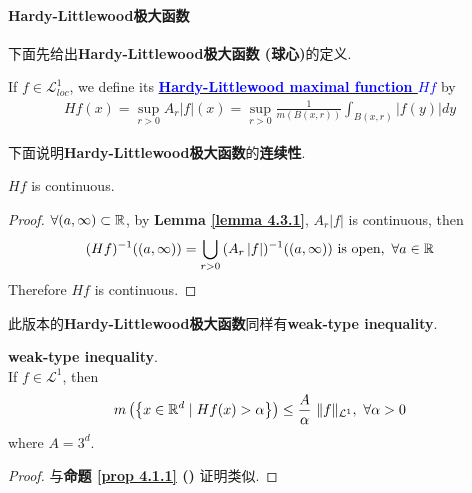 \newpage
\paragraph{\textbf{Hardy-Littlewood}极大函数}
	下面先给出\textbf{Hardy-Littlewood极大函数 (球心)}的定义.
	\begin{defn}\label{def 4.3.3}
		If $f \in \mathcal{L}_{loc}^{1}$, we define its \underline{\textcolor{blue}{\textbf{Hardy-Littlewood maximal function $Hf$}}} by
		\begin{align}
			Hf(x) = \sup_{r > 0}{A_{r} \left| f \right| (x)} = \sup_{r > 0}{\frac{1}{m(B(x , r))} \int_{B(x , r)}{\left| f(y) \right| dy}}
		\end{align}
	\end{defn}

	\vspace{4em}
	下面说明\textbf{Hardy-Littlewood极大函数}的\textbf{连续性}.
	\begin{corollary}\label{cor 4.3.2}
		$Hf$ is continuous.
		
		\vspace{2em}
		\begin{proof}
			$\forall (a , \infty) \subset \mathbb{R}$, by \textbf{Lemma \ref{lemma 4.3.1}}, $A_{r} \left| f \right|$ is continuous, then
			\begin{align}
				(Hf)^{-1}((a , \infty)) = \bigcup_{r > 0}{(A_{r} \left| f \right|)^{-1} ((a , \infty))} \,\, \text{is open}, \,\, \forall a \in \mathbb{R}
			\end{align}
			Therefore $Hf$ is continuous.
		\end{proof}
	\end{corollary}

	\vspace{4em}
	此版本的\textbf{Hardy-Littlewood极大函数}同样有\textbf{weak-type inequality}.
	\begin{proposition}\label{prop 4.3.3}
		\textbf{weak-type inequality}. \\
		If $f \in \mathcal{L}^{1}$, then
		\begin{align}
			m\left( \left\{ x \in \mathbb{R}^d \mid Hf(x) > \alpha \right\} \right) 
			\leq \frac{A}{\alpha} \,\, \Vert f \Vert_{\mathcal{L}^1}, \,\, \forall \alpha > 0
		\end{align}
		where $A = 3^d$.
		
		\vspace{2em}
		\begin{proof}
			与\textbf{命题 \ref{prop 4.1.1} ()} 证明类似.
		\end{proof}
	\end{proposition}

